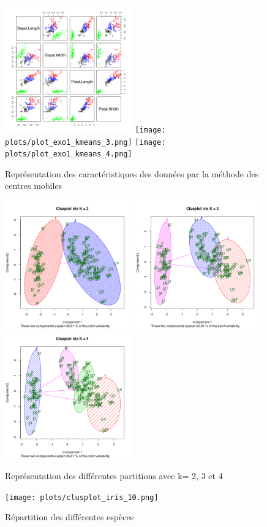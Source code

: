 \documentclass[a4paper, 10pt]{article}
\begin{document}
\begin{figure}[h!]
\includegraphics[height = 5.5cm, width = 5.5cm]{plots/plot_exo1_kmeans_2.png}
\texttt{[image: plots/plot\_exo1\_kmeans\_3.png]}
\texttt{[image: plots/plot\_exo1\_kmeans\_4.png]}
  \caption{Représentation des caractéristiques des données par la méthode des centres mobiles } 
\includegraphics[height = 5.5cm, width = 5.5cm]{plots/clusplot_exo1_kmeans_2.png}
\includegraphics[height = 5.5cm, width = 5.5cm]{plots/clusplot_exo1_kmeans_3.png}
\includegraphics[height = 5.5cm, width = 5.5cm]{plots/clusplot_exo1_kmeans_4.png}
  \caption{Représentation des différentes partitions avec k= 2, 3 et 4 }
\texttt{[image: plots/clusplot\_iris\_10.png]}
\centering
  \caption{Répartition des différentes espèces}
\end{figure}\\
\end{document}
